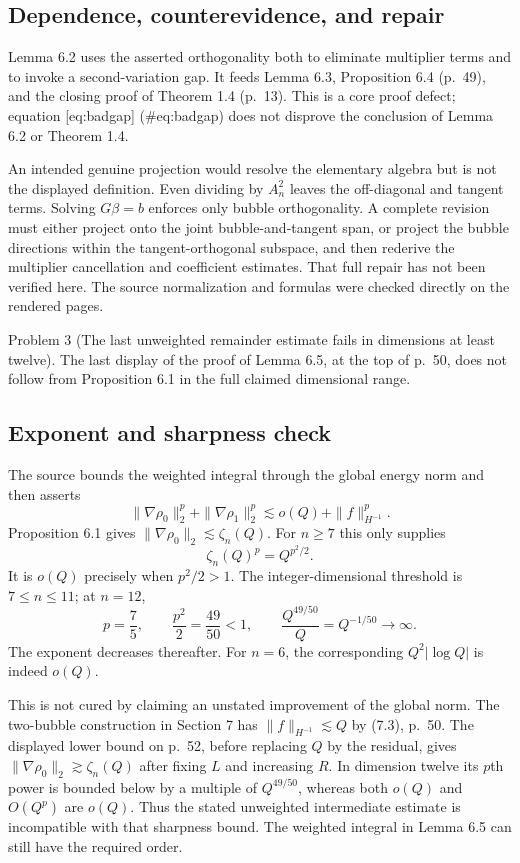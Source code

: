 \documentclass[10pt]{article}
\begin{document}
\subsection*{Dependence, counterevidence, and repair}
Lemma 6.2 uses the asserted orthogonality both to eliminate multiplier terms and to invoke a second-variation gap. It feeds Lemma 6.3, Proposition 6.4 (p. 49), and the closing proof of Theorem 1.4 (p. 13). This is a core proof defect; equation [eq:badgap] (\#eq:badgap) does not disprove the conclusion of Lemma 6.2 or Theorem 1.4.\par
An intended genuine projection would resolve the elementary algebra but is not the displayed definition. Even dividing by \(A_n^2\) leaves the off-diagonal and tangent terms. Solving \(G\beta=b\) enforces only bubble orthogonality. A complete revision must either project onto the joint bubble-and-tangent span, or project the bubble directions within the tangent-orthogonal subspace, and then rederive the multiplier cancellation and coefficient estimates. That full repair has not been verified here. The source normalization and formulas were checked directly on the rendered pages.\par
Problem 3 (The last unweighted remainder estimate fails in dimensions at least twelve).  The last display of the proof of Lemma 6.5, at the top of p. 50, does not follow from Proposition 6.1 in the full claimed dimensional range.\par
\subsection*{Exponent and sharpness check}
The source bounds the weighted integral through the global energy norm and then asserts \[\|\nabla\rho_0\|_2^p+\|\nabla\rho_1\|_2^p
 \lesssim o(Q)+\|f\|_{H^{-1}}^p.\] Proposition 6.1 gives \(\|\nabla\rho_0\|_2\lesssim\zeta_n(Q)\). For \(n\ge7\) this only supplies \[\zeta_n(Q)^p=Q^{p^2/2}.\] It is \(o(Q)\) precisely when \(p^2/2>1\). The integer-dimensional threshold is \(7\le n\le11\); at \(n=12\), \[p=\frac75,\qquad \frac{p^2}{2}=\frac{49}{50}<1,\qquad
 \frac{Q^{49/50}}{Q}=Q^{-1/50}\longrightarrow\infty.\] The exponent decreases thereafter. For \(n=6\), the corresponding \(Q^2|\log Q|\) is indeed \(o(Q)\).\par
This is not cured by claiming an unstated improvement of the global norm. The two-bubble construction in Section 7 has \(\|f\|_{H^{-1}}\lesssim Q\) by (7.3), p. 50. The displayed lower bound on p. 52, before replacing \(Q\) by the residual, gives \(\|\nabla\rho_0\|_2\gtrsim\zeta_n(Q)\) after fixing \(L\) and increasing \(R\). In dimension twelve its \(p\)th power is bounded below by a multiple of \(Q^{49/50}\), whereas both \(o(Q)\) and \(O(Q^p)\) are \(o(Q)\). Thus the stated unweighted intermediate estimate is incompatible with that sharpness bound. The weighted integral in Lemma 6.5 can still have the required order.\par
\end{document}
